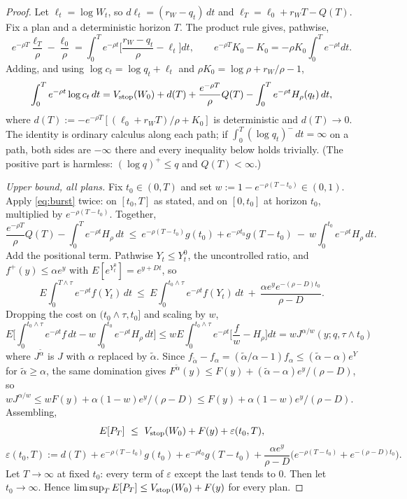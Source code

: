 \begin{proof}
Let $\ell_t=\log W_t$, so $d\ell_t=(r_W-q_t)\,dt$ and $\ell_T=\ell_0+r_WT-Q(T)$. Fix a plan and a deterministic horizon $T$. The product rule gives, pathwise,
\[
e^{-\rho T}\frac{\ell_T}{\rho}-\frac{\ell_0}{\rho}=\int_0^T e^{-\rho t}\Big[\frac{r_W-q_t}{\rho}-\ell_t\Big]dt,
\qquad
e^{-\rho T}K_0-K_0=-\rho K_0\int_0^T e^{-\rho t}dt .
\]
Adding, and using $\log c_t=\log q_t+\ell_t$ and $\rho K_0=\log\rho+r_W/\rho-1$,
\begin{equation}
\int_0^T e^{-\rho t}\log c_t\,dt
=V_{\rm stop}(W_0)+d(T)+\frac{e^{-\rho T}}{\rho}Q(T)-\int_0^T e^{-\rho t}H_\rho(q_t)\,dt, \label{eq:budget}
\end{equation}
where $d(T):=-e^{-\rho T}[(\ell_0+r_WT)/\rho+K_0]$ is deterministic and $d(T)\to0$. The identity is ordinary calculus along each path; if $\int_0^T(\log q_t)^-\,dt=\infty$ on a path, both sides are $-\infty$ there and every inequality below holds trivially. (The positive part is harmless: $(\log q)^+\le q$ and $Q(T)<\infty$.)

\emph{Upper bound, all plans.} Fix $t_0\in(0,T)$ and set $w:=1-e^{-\rho(T-t_0)}\in(0,1)$. Apply \eqref{eq:burst} twice: on $[t_0,T]$ as stated, and on $[0,t_0]$ at horizon $t_0$, multiplied by $e^{-\rho(T-t_0)}$. Together,
\[
\frac{e^{-\rho T}}{\rho}Q(T)-\int_0^T e^{-\rho t}H_\rho\,dt\ \le\ e^{-\rho(T-t_0)}g(t_0)+e^{-\rho t_0}g(T-t_0)\ -\ w\int_0^{t_0}e^{-\rho t}H_\rho\,dt .
\]
Add the positional term. Pathwise $Y_t\le Y^0_t$, the uncontrolled ratio, and $f^+(y)\le\alpha e^y$ with $E[e^{Y^0_t}]=e^{y+Dt}$, so
\[
E\int_0^{T\wedge\tau}e^{-\rho t}f(Y_t)\,dt\ \le\ E\int_0^{t_0\wedge\tau}e^{-\rho t}f(Y_t)\,dt\ +\ \frac{\alpha e^{y}e^{-(\rho-D)t_0}}{\rho-D}.
\]
Dropping the cost on $(t_0\wedge\tau,t_0]$ and scaling by $w$,
\[
E\Big[\int_0^{t_0\wedge\tau}e^{-\rho t}f\,dt-w\int_0^{t_0}e^{-\rho t}H_\rho\,dt\Big]
\le wE\int_0^{t_0\wedge\tau}e^{-\rho t}\Big[\frac{f}{w}-H_\rho\Big]dt
= wJ^{\alpha/w}(y;q,\tau\wedge t_0)
\]
where $J^{\tilde\alpha}$ is $J$ with $\alpha$ replaced by $\tilde\alpha$. Since $f_{\tilde\alpha}-f_\alpha=(\tilde\alpha/\alpha-1)f_\alpha\le(\tilde\alpha-\alpha)e^{Y}$ for $\tilde\alpha\ge\alpha$, the same domination gives $F^{\tilde\alpha}(y)\le F(y)+(\tilde\alpha-\alpha)e^y/(\rho-D)$, so $wJ^{\alpha/w}\le wF(y)+\alpha(1-w)e^y/(\rho-D)\le F(y)+\alpha(1-w)e^y/(\rho-D)$. Assembling,
\[
E[P_T]\ \le\ V_{\rm stop}(W_0)+F(y)+\varepsilon(t_0,T),
\]
\[
\varepsilon(t_0,T):=d(T)+e^{-\rho(T-t_0)}g(t_0)+e^{-\rho t_0}g(T-t_0)+\frac{\alpha e^y}{\rho-D}\Big(e^{-\rho(T-t_0)}+e^{-(\rho-D)t_0}\Big).
\]
Let $T\to\infty$ at fixed $t_0$: every term of $\varepsilon$ except the last tends to $0$. Then let $t_0\to\infty$. Hence $\limsup_TE[P_T]\le V_{\rm stop}(W_0)+F(y)$ for every plan.


\end{proof}
